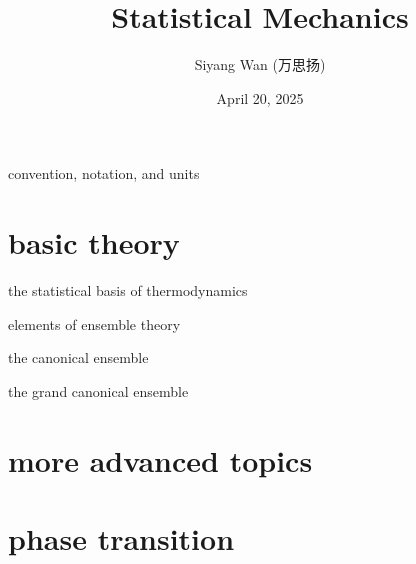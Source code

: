\documentclass[10pt, a4paper]{report}
\title{\Huge \textbf{Statistical Mechanics}}
\author{Siyang Wan (万思扬)}
\date{April 20, 2025}
\numberwithin{equation}{section}
\begin{document}
	\maketitle
	
	\tableofcontents
	
	\pagebreak
	
	{convention, notation, and units}
	
	\part{basic theory}
	
	{the statistical basis of thermodynamics}
	
	{elements of ensemble theory}
	
	{the canonical ensemble}
	
	{the grand canonical ensemble}
	
	\part{more advanced topics}
	
	\part{phase transition}
	
	\appendix
	
	
\end{document}
